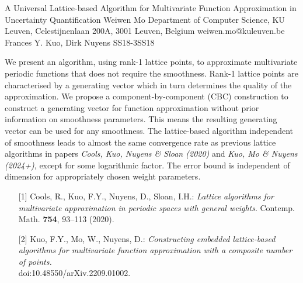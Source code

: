 \begin{talk}
  {A Universal Lattice-based Algorithm for Multivariate Function Approximation in Uncertainty Quantification}%
  {Weiwen Mo}%
  {Department of Computer Science, KU Leuven, Celestijnenlaan 200A, 3001 Leuven, Belgium}%
  {weiwen.mo@kuleuven.be}%
  {Frances Y. Kuo, Dirk Nuyens}%
{}{}{SS18-3}{SS18}

			
We present an algorithm, using rank-1 lattice points,  to approximate multivariate periodic functions that does not require the smoothness. Rank-1 lattice points are characterised by a generating vector which in turn determines the quality of the approximation. We propose a component-by-component (CBC) construction to construct a generating vector for function approximation without prior information on smoothness parameters. This means the resulting generating vector can be used for any smoothness. The lattice-based algorithm independent of smoothness leads to almost the same convergence rate as previous lattice algorithms in papers \emph{Cools, Kuo, Nuyens \& Sloan \textup{(}2020\textup{)}} and \emph{Kuo, Mo \& Nuyens \textup{(}2024+\textup{)}}, except for some logarithmic factor. 
The error bound is independent of dimension for appropriately chosen weight parameters.

\medskip

\begin{enumerate}
	\item[{[1]}] Cools, R., Kuo, F.Y., Nuyens, D., Sloan, I.H.: {\it Lattice algorithms for multivariate approximation in periodic spaces with general weights}. Contemp. Math. \textbf{754}, 93--113 (2020).
	\item[{[2]}] Kuo, F.Y., Mo, W., Nuyens, D.: {\it Constructing embedded lattice-based algorithms for multivariate function approximation with a composite number of points.} \\ doi:10.48550/arXiv.2209.01002.
\end{enumerate}

\end{talk}

